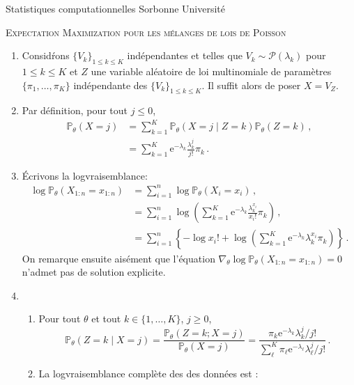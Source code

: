 \documentclass[a4paper,10pt,fleqn]{article}
\newcommand{\1}{\ensuremath{\mathbbm{1}}}
\begin{document}
\noindent Statistiques computationnelles \hfill Sorbonne Universit\'e \\


\noindent\hrulefill

\begin{center}
\textsc{Expectation Maximization pour les m\'elanges de lois de Poisson}
\end{center}
\hrulefill

\medskip

\begin{enumerate}
\item Consid\'rons $\{V_k\}_{1\leq k\leq K}$ ind\'ependantes et telles que $V_k\sim \mathcal{P}(\lambda_k)$ pour $1\leq k\leq K$ et $Z$ une variable al\'eatoire de loi multinomiale de param\`etres $\{\pi_1, \ldots,\pi_K\}$ ind\'ependante des $\{V_k\}_{1\leq k\leq K}$. Il suffit alors de poser $X = V_Z$.
\item Par d\'efinition, pour tout $j\leq 0$,
\begin{align*}
\mathbb{P}_\theta\left(X=j\right) &= \sum_{k=1}^K \mathbb{P}_\theta\left(X=j \middle |Z = k\right)\mathbb{P}_\theta\left(Z = k\right)\,,\\
&=  \sum_{k=1}^K \mathrm{e}^{-\lambda_k}\frac{\lambda_k^j}{j!}\pi_k\,.
\end{align*}
\item \'Ecrivons la logvraisemblance:
\begin{align*}
\log \mathbb{P}_\theta\left(X_{1:n}=x_{1:n}\right) &= \sum_{i=1}^n\log \mathbb{P}_\theta\left(X_{i}=x_{i}\right)\,,\\
&=\sum_{i=1}^n\log \left(\sum_{k=1}^K \mathrm{e}^{-\lambda_k}\frac{\lambda_k^{x_i}}{x_i!}\pi_k\right)\,,\\
&=\sum_{i=1}^n\left\{-\log  x_i! + \log \left(\sum_{k=1}^K \mathrm{e}^{-\lambda_k}\lambda_k^{x_i} \pi_k\right)\right\}\,.
\end{align*}
On remarque ensuite ais\'ement que l'\'equation $\nabla_\theta \log \mathbb{P}_\theta\left(X_{1:n}=x_{1:n}\right)  = 0$ n'admet pas de solution explicite.
\item
\begin{enumerate}
\item Pour tout $\theta$ et tout $k\in\{1,\ldots,K\}$, $j\geq 0$,
$$
\mathbb{P}_\theta\left(Z=k\middle|X=j\right) = \frac{\mathbb{P}_\theta\left(Z=k;X=j\right)}{\mathbb{P}_\theta\left(X=j\right)} = \frac{\pi_k \mathrm{e}^{-\lambda_k}\lambda_k^{j}/j!}{\sum_{\ell}^K\pi_\ell \mathrm{e}^{-\lambda_\ell}\lambda_\ell^{j}/j!}\,.
$$
\item La logvraisemblance compl\`ete des des donn\'ees est :

\end{enumerate}
\end{enumerate}
\end{document}
